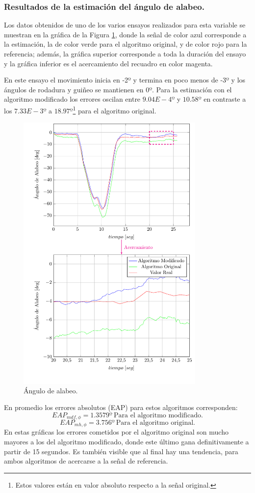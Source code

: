 \documentclass[conference]{IEEEtran}
\begin{document}
\subsubsection{Resultados de la estimación del ángulo de alabeo.}
Los datos obtenidos de uno de los varios ensayos realizados para esta variable se muestran en la gráfica de la Figura \ref{PlotPh1}, donde la señal de color azul corresponde a la estimación, la de color verde para el  algoritmo original, y de color rojo para la referencia; además, la gráfica superior corresponde a toda la duración del ensayo y la gráfica inferior es el acercamiento del recuadro en color magenta.\par
En este ensayo el movimiento inicia en -2º y termina en poco menos de -3º y los ángulos de rodadura y guiñeo se mantienen en 0º. Para la estimación con el algoritmo modificado los errores oscilan entre $9.04E-4º$ y $10.58º$ en contraste a los $7.33E-3º$ a $18.97º$\footnote{Estos valores están en valor absoluto respecto a la señal original.} para el algoritmo original. 
\begin{figure}
\begin{center}
\includegraphics[width=25em]{PlotPh25a.pdf}
\caption{Ángulo de alabeo.}
\label{PlotPh1}
\end{center}
\end{figure}
En promedio los errores absolutos (EAP) para estos algoritmos corresponden:
\begin{equation*}
EAP_{mdf,\phi}=1.3579º~\text{Para el algoritmo modificado.}
\end{equation*}
\begin{equation*}
EAP_{mh,\phi}=3.756º~\text{Para el algoritmo original.}
\end{equation*}
En estas gráficas los errores cometidos por el algoritmo original son mucho mayores a los del algoritmo modificado, donde este último gana definitivamente a partir de 15 segundos. Es también visible que al final hay una tendencia, para ambos algoritmos de acercarse a la señal de referencia.
\end{document}
